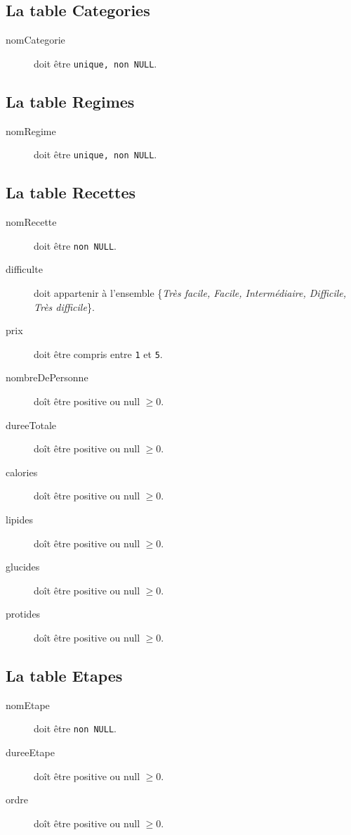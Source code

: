 \subsection{La table Categories}
\begin{description}
    \item[nomCategorie] doit être \texttt{unique, non NULL}.
\end{description}

\subsection{La table Regimes}
\begin{description}
    \item[nomRegime] doit être \texttt{unique, non NULL}.
\end{description}

\subsection{La table Recettes}
\begin{description}
    \item[nomRecette] doit être \texttt{non NULL}.
    \item[difficulte] doit appartenir à l'ensemble \{\textit{Très facile, Facile, Intermédiaire, Difficile, Très difficile}\}.
    \item[prix] doit être compris entre \texttt{1} et \texttt{5}.
    \item[nombreDePersonne] doît être positive ou null \(\geqslant 0\).
    \item[dureeTotale] doît être positive ou null \(\geqslant 0\).
    \item[calories] doît être positive ou null \(\geqslant 0\).
    \item[lipides] doît être positive ou null \(\geqslant 0\).
    \item[glucides] doît être positive ou null \(\geqslant 0\).
    \item[protides] doît être positive ou null \(\geqslant 0\).
\end{description}

\subsection{La table Etapes}
\begin{description}
    \item[nomEtape] doit être \texttt{non NULL}.
    \item[dureeEtape] doît être positive ou null \(\geqslant 0\).
    \item[ordre] doît être positive ou null \(\geqslant 0\).
\end{description}


